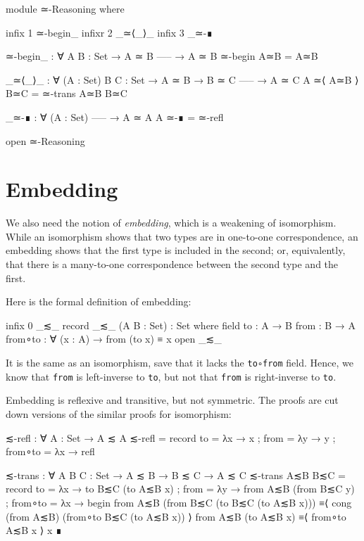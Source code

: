 \begin{fence}
\begin{code}
module ≃-Reasoning where

  infix  1 ≃-begin_
  infixr 2 _≃⟨_⟩_
  infix  3 _≃-∎

  ≃-begin_ : ∀ {A B : Set}
    → A ≃ B
      -----
    → A ≃ B
  ≃-begin A≃B = A≃B

  _≃⟨_⟩_ : ∀ (A : Set) {B C : Set}
    → A ≃ B
    → B ≃ C
      -----
    → A ≃ C
  A ≃⟨ A≃B ⟩ B≃C = ≃-trans A≃B B≃C

  _≃-∎ : ∀ (A : Set)
      -----
    → A ≃ A
  A ≃-∎ = ≃-refl

open ≃-Reasoning
\end{code}
\end{fence}

\hypertarget{embedding}{%
\section{Embedding}\label{embedding}}

We also need the notion of \emph{embedding}, which is a weakening of
isomorphism. While an isomorphism shows that two types are in one-to-one
correspondence, an embedding shows that the first type is included in
the second; or, equivalently, that there is a many-to-one correspondence
between the second type and the first.

Here is the formal definition of embedding:

\begin{fence}
\begin{code}
infix 0 _≲_
record _≲_ (A B : Set) : Set where
  field
    to      : A → B
    from    : B → A
    from∘to : ∀ (x : A) → from (to x) ≡ x
open _≲_
\end{code}
\end{fence}

It is the same as an isomorphism, save that it lacks the
\texttt{to∘from} field. Hence, we know that \texttt{from} is
left-inverse to \texttt{to}, but not that \texttt{from} is right-inverse
to \texttt{to}.

Embedding is reflexive and transitive, but not symmetric. The proofs are
cut down versions of the similar proofs for isomorphism:

\begin{fence}
\begin{code}
≲-refl : ∀ {A : Set} → A ≲ A
≲-refl =
  record
    { to      = λ{x → x}
    ; from    = λ{y → y}
    ; from∘to = λ{x → refl}
    }

≲-trans : ∀ {A B C : Set} → A ≲ B → B ≲ C → A ≲ C
≲-trans A≲B B≲C =
  record
    { to      = λ{x → to   B≲C (to   A≲B x)}
    ; from    = λ{y → from A≲B (from B≲C y)}
    ; from∘to = λ{x →
        begin
          from A≲B (from B≲C (to B≲C (to A≲B x)))
        ≡⟨ cong (from A≲B) (from∘to B≲C (to A≲B x)) ⟩
          from A≲B (to A≲B x)
        ≡⟨ from∘to A≲B x ⟩
          x
        ∎}
     }
\end{code}
\end{fence}

